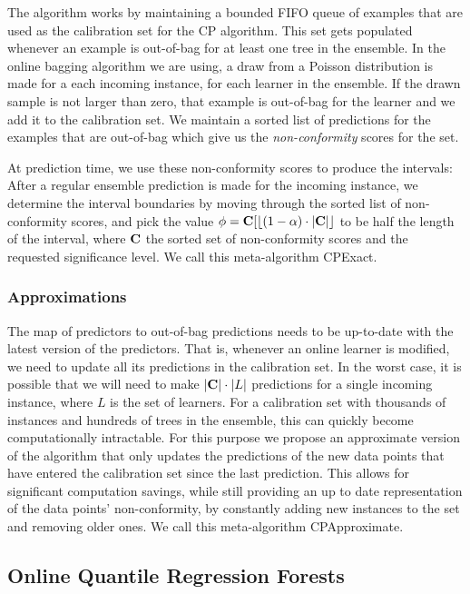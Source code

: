The algorithm works by maintaining a bounded FIFO queue of examples
that are used as the calibration set for the CP algorithm. This set
gets populated whenever an example is out-of-bag for at least one
tree in the ensemble. In the online bagging algorithm we are using,
a draw from a Poisson distribution is made for a each incoming instance,
for each learner in the ensemble. If the drawn sample is not larger
than zero, that example is out-of-bag for the learner and we add it
to the calibration set. We maintain a sorted list of predictions for the
examples that are out-of-bag which give us the \emph{non-conformity}
scores for the set.

At prediction time, we use these non-conformity scores to produce the
intervals: After a regular ensemble prediction is made for the incoming
instance, we determine the interval boundaries by moving through the
sorted list of non-conformity scores, and pick the value
$\phi = \calSet[\floor*{(1 - \significance) \cdot |\calSet|}$ to be half the
length of the interval, where $\calSet$ the sorted set of non-conformity scores
and \significance the requested significance level.
We call this meta-algorithm CPExact.

\subsubsection*{Approximations}

The map of predictors to out-of-bag predictions needs to be up-to-date with
the latest version of the predictors. That is, whenever an online learner
is modified, we need to update all its predictions in the calibration set.
In the worst case, it is possible that we will need to make $|\calSet| \cdot |L|$
predictions for a single incoming instance, where $L$ is the set of learners.
For a calibration set with thousands of instances and hundreds of trees in the ensemble, this can quickly
become computationally intractable. For this purpose we propose an approximate
version of the algorithm that only updates the predictions of the new
data points that have entered the calibration set since the last prediction.
This allows for significant computation savings, while still providing
an up to date representation of the data points' non-conformity, by constantly
adding new instances to the set and removing older ones. We call this
meta-algorithm CPApproximate.

\subsection{Online Quantile Regression Forests}

